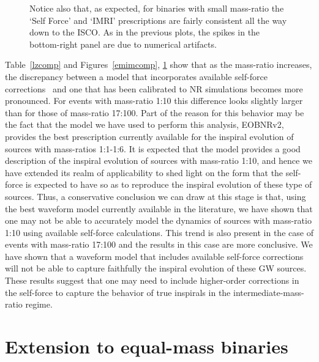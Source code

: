 \begin{figure}[ht]
{Notice also that, as expected, for binaries with small mass-ratio the `Self Force' and `IMRI' prescriptions are fairly consistent all the way down to the ISCO.  As in the previous plots, the spikes in the bottom-right panel are due to numerical artifacts.}
\label{lzfull}
\end{figure}

Table~\ref{lzcomp} and Figures~\ref{emimcomp}, \ref{lzfull} show that as the mass-ratio increases, the discrepancy between a model that incorporates available self-force corrections~\cite{sago} and one that has been calibrated to NR simulations becomes more pronounced. For events with mass-ratio 1:10 this difference looks slightly larger than for those of mass-ratio 17:100. Part of the reason for this behavior may be the fact that the model we have used to perform this analysis, EOBNRv2, provides the best prescription currently available for the inspiral evolution of sources with mass-ratios 1:1-1:6. It is expected that the model provides a good description of the inspiral evolution of sources with mass-ratio 1:10, and hence we have extended its realm of applicability to shed light on the form that the self-force is expected to have so as to reproduce the inspiral evolution of these type of sources. Thus, a conservative conclusion we can draw at this stage is that, using the best waveform model currently 
available in the literature, we have shown that  one may not be able to accurately model the dynamics of sources with mass-ratio 1:10 using available self-force calculations.  This trend is also present   in the case of events with mass-ratio 17:100 and the results in this case are more conclusive. We have shown that a waveform model that includes available self-force corrections will not be able to capture faithfully the inspiral evolution of these GW sources. These results suggest that one may need to include higher-order corrections in the self-force to capture the behavior of true inspirals in the intermediate-mass-ratio regime. 

 
  
\section{Extension to equal-mass binaries}

